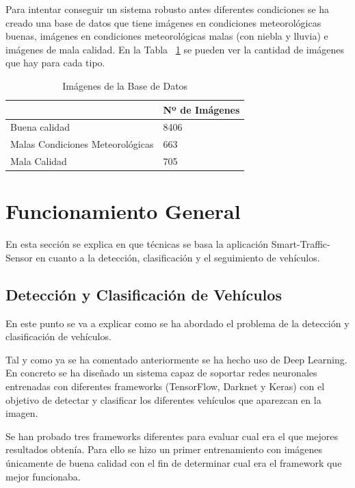 Para intentar conseguir un sistema robusto antes diferentes condiciones se ha creado una base de datos que tiene imágenes en condiciones meteorológicas buenas, imágenes en condiciones meteorológicas malas (con niebla y lluvia) e imágenes de mala calidad. En la Tabla ~\ref{tabla_img_base_datos} se pueden ver la cantidad de imágenes que hay para cada tipo.
\begin{table}[htb]
\begin{center}
\begin{tabular}{|l|l|}
\hline
\cline{2-2}& Nº de Imágenes\\
\hline \hline
Buena calidad & 8406 \\ \hline
Malas Condiciones Meteorológicas & 663\\ \hline
Mala Calidad & 705\\ \hline
\end{tabular}
\caption{Imágenes de la Base de Datos}
\label{tabla_img_base_datos}
\end{center}
\end{table}

\section{Funcionamiento General}

En esta sección se explica en que técnicas se basa la aplicación Smart-Traffic-Sensor en cuanto a la detección, clasificación y el seguimiento de vehículos.

\subsection{Detección y Clasificación de Vehículos}

En este punto se va a explicar como se ha abordado el problema de la detección y clasificación de vehículos.

Tal y como ya se ha comentado anteriormente se ha hecho uso de Deep Learning. En concreto se ha diseñado un sistema capaz de soportar redes neuronales entrenadas con diferentes frameworks (TensorFlow, Darknet y Keras) con el objetivo de detectar y clasificar los diferentes vehículos que aparezcan en la imagen.

Se han probado tres frameworks diferentes para evaluar cual era el que mejores resultados obtenía. Para ello se hizo un primer entrenamiento con imágenes únicamente de buena calidad con el fin de determinar cual era el framework que mejor funcionaba.


